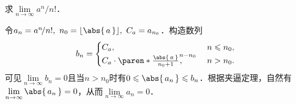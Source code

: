 \begin{example}
  \label{eg:factexp}
  求\(\lim\limits_{n\to\infty} {a^n}\!/{n!}\)． %

  \begin{remark}
    令\(a_n = a^n\!/n!,\ n_0 = \floor{\abs{\,a\,}},\ C_a = a_{n_0}\)．构造数列
    \begin{equation*}
      b_n =
      \begin{cases}
        C_a, & n \le n_0, \\
        C_a \cdot \paren*{\frac{\abs{\,a\,}}{n_0 + 1}}^{\mathrlap{n-n_0}}, \qquad & n > n_0.
      \end{cases}
    \end{equation*}
    可见\(\lim\limits_{n\to\infty} b_n = 0\)且当\(n > n_0\)时有\(0 \le \abs{\,a_n\,} \le b_n\)．根据夹逼定理，自然有\(\lim\limits_{n\to\infty} \abs{\,a_n\,} = 0\)，从而\(\lim\limits_{n\to\infty} a_n = 0\)．
  \end{remark}


\end{example}

